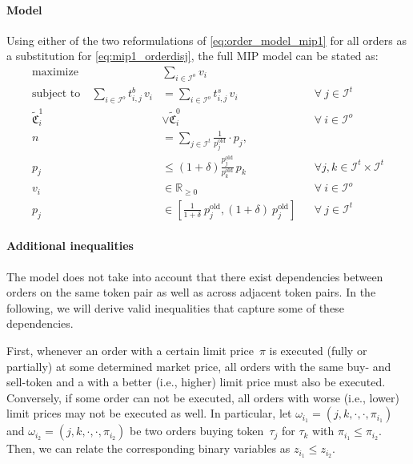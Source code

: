 \documentclass[11pt,parskip=full]{scrartcl}%
\newcommand*{\ie}{i.e., }
\newcommand*{\itokens}{\mathcal{I}^t}       %
\newcommand*{\iorders}{\mathcal{I}^o}       %
\begin{document}
\paragraph{Model}

Using either of the two reformulations of \eqref{eq:order_model_mip1} for all orders as a
substitution for \eqref{eq:mip1_orderdisj}, the full MIP model can be stated as:
\begin{subequations}
\begin{align}
  \text{maximize} \quad & \sum\limits_{i \in \iorders} v_i
  \label{eq:mip1_objective}
  \\[2mm]
  \text{subject to} \quad
  \sum\limits_{i \in \iorders} t^b_{i,j} \, v_i
  &= \sum\limits_{i \in \iorders} t^s_{i,j} \, v_i
  && \forall \> j \in \itokens
  \label{eq:mip1_tokenbalance}
  \\[4mm]
  \tilde{\mathfrak{C}}^1_i &\lor \tilde{\mathfrak{C}}^0_i
  && \forall \> i \in \iorders
  \label{eq:mip1_orderdisj} 
  \\[2mm]
  n
  &= \sum\limits_{j \in \itokens} \frac{1}{p^\mathrm{old}_j} \cdot p_j,
  \label{eq:mip1_reftoken}
  \\[1mm]
  p_j
  &\le \left(1+\delta\right) \frac{p^\mathrm{old}_j}{p^\mathrm{old}_k} \, p_k
  && \forall j,k \in \itokens \times \itokens
  \label{eq:mip1_maxfluct}
  \\[2mm]
  v_i
  &\in \mathbb{R}_{\ge 0}
  && \forall \> i \in \iorders
  \\[1mm]
  p_j
  &\in \left[ \frac{1} {1+\delta} \> p^\mathrm{old}_j, (1+\delta) \> p^\mathrm{old}_j \right]
  && \forall \> j \in \itokens
\end{align}
\label{eq:mip1}
\end{subequations}

\vspace{-.5cm}
\paragraph{Additional inequalities}

The model does not take into account that there exist dependencies between orders on the same token
pair as well as across adjacent token pairs.
In the following, we will derive valid inequalities that capture some of these dependencies.

First, whenever an order with a certain limit price~$\pi$ is executed (fully or partially)
at some determined market price, all orders with the same buy- and sell-token and a with a better 
(\ie higher) limit price must also be executed.
Conversely, if some order can not be executed, all orders with worse (\ie lower) limit prices may
not be executed as well.
In particular, let
$\omega_{i_1} = (j,k,\cdot,\cdot,\pi_{i_1})$ and $\omega_{i_2} = (j,k,\cdot,\cdot,\pi_{i_2})$
be two orders buying token~$\tau_j$ for $\tau_k$ with $\pi_{i_1} \le \pi_{i_2}$.
Then, we can relate the corresponding binary variables as $z_{i_1} \le z_{i_2}$.
\end{document}
